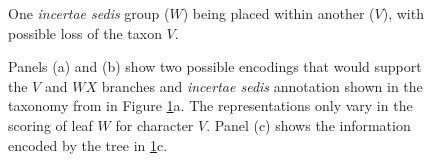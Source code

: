\documentclass[english]{article}
\newcommand{\lyxdot}{.}
\begin{document}
\begin{figure}
\caption{\label{fig:Placing-one-incertae}
One \emph{incertae sedis} group ($W$) being placed within another ($V$), with possible
loss of the taxon $V$.}
\end{figure}

\begin{figure}
\hfill{}
\hfill
{}
\caption{\label{fig:Placing-one-incertae-MRP}
Panels (a) and (b) show two possible encodings that would support the $V$ and $WX$ branches and \emph{incertae sedis}
annotation shown in the taxonomy from in Figure \ref{fig:Placing-one-incertae}a.
The representations only vary in the scoring of leaf $W$ for character $V$. Panel (c) shows the information encoded by the tree in \ref{fig:Placing-one-incertae}c. }
\end{figure}
\end{document}
